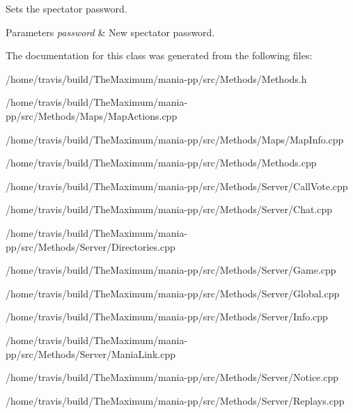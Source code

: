Sets the spectator password. 


\begin{DoxyParams}{Parameters}
{\em password} & New spectator password. \\
\hline
\end{DoxyParams}


The documentation for this class was generated from the following files\-:\begin{DoxyCompactItemize}
\item 
/home/travis/build/\-The\-Maximum/mania-\/pp/src/\-Methods/Methods.\-h\item 
/home/travis/build/\-The\-Maximum/mania-\/pp/src/\-Methods/\-Maps/Map\-Actions.\-cpp\item 
/home/travis/build/\-The\-Maximum/mania-\/pp/src/\-Methods/\-Maps/Map\-Info.\-cpp\item 
/home/travis/build/\-The\-Maximum/mania-\/pp/src/\-Methods/Methods.\-cpp\item 
/home/travis/build/\-The\-Maximum/mania-\/pp/src/\-Methods/\-Server/Call\-Vote.\-cpp\item 
/home/travis/build/\-The\-Maximum/mania-\/pp/src/\-Methods/\-Server/Chat.\-cpp\item 
/home/travis/build/\-The\-Maximum/mania-\/pp/src/\-Methods/\-Server/Directories.\-cpp\item 
/home/travis/build/\-The\-Maximum/mania-\/pp/src/\-Methods/\-Server/Game.\-cpp\item 
/home/travis/build/\-The\-Maximum/mania-\/pp/src/\-Methods/\-Server/Global.\-cpp\item 
/home/travis/build/\-The\-Maximum/mania-\/pp/src/\-Methods/\-Server/Info.\-cpp\item 
/home/travis/build/\-The\-Maximum/mania-\/pp/src/\-Methods/\-Server/Mania\-Link.\-cpp\item 
/home/travis/build/\-The\-Maximum/mania-\/pp/src/\-Methods/\-Server/Notice.\-cpp\item 
/home/travis/build/\-The\-Maximum/mania-\/pp/src/\-Methods/\-Server/Replays.\-cpp\end{DoxyCompactItemize}
